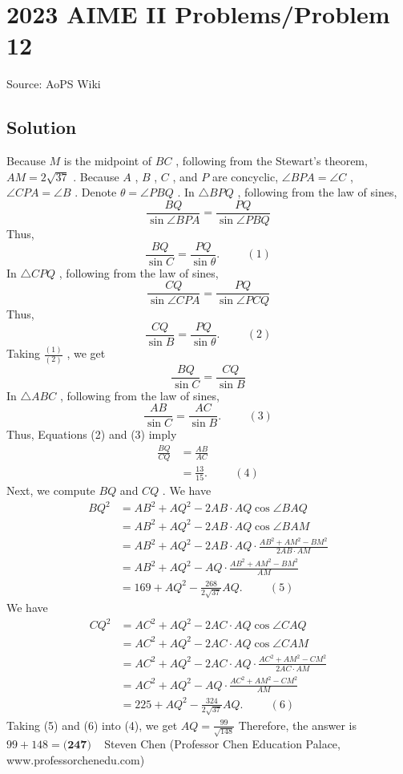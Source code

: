 \documentclass[12pt]{article}
\begin{document}
\section*{{2023 AIME II Problems/Problem 12}}
Source: AoPS Wiki

\subsection*{Solution}
Because $M$ is the midpoint of $BC$ , following from the Stewart's theorem, $AM = 2 \sqrt{37}$ . Because $A$ , $B$ , $C$ , and $P$ are concyclic, $\angle BPA = \angle C$ , $\angle CPA = \angle B$ . Denote $\theta = \angle PBQ$ . In $\triangle BPQ$ , following from the law of sines, \[ \frac{BQ}{\sin \angle BPA} = \frac{PQ}{\sin \angle PBQ} \] Thus, \[ \frac{BQ}{\sin C} = \frac{PQ}{\sin \theta} . \hspace{1cm} (1) \] In $\triangle CPQ$ , following from the law of sines, \[ \frac{CQ}{\sin \angle CPA} = \frac{PQ}{\sin \angle PCQ} \] Thus, \[ \frac{CQ}{\sin B} = \frac{PQ}{\sin \theta} . \hspace{1cm} (2) \] Taking $\frac{(1)}{(2)}$ , we get \[ \frac{BQ}{\sin C} = \frac{CQ}{\sin B} \] In $\triangle ABC$ , following from the law of sines, \[ \frac{AB}{\sin C} = \frac{AC}{\sin B} . \hspace{1cm} (3) \] Thus, Equations (2) and (3) imply \begin{align*} \frac{BQ}{CQ} & = \frac{AB}{AC} \\ & = \frac{13}{15} . \hspace{1cm} (4) \end{align*} Next, we compute $BQ$ and $CQ$ . We have \begin{align*} BQ^2 & = AB^2 + AQ^2 - 2 AB\cdot AQ \cos \angle BAQ \\ & = AB^2 + AQ^2 - 2 AB\cdot AQ \cos \angle BAM \\ & = AB^2 + AQ^2 - 2 AB\cdot AQ \cdot \frac{AB^2 + AM^2 - BM^2}{2 AB \cdot AM} \\ & = AB^2 + AQ^2 - AQ \cdot \frac{AB^2 + AM^2 - BM^2}{AM} \\ & = 169 + AQ^2 - \frac{268}{2 \sqrt{37}} AQ . \hspace{1cm} (5) \end{align*} We have \begin{align*} CQ^2 & = AC^2 + AQ^2 - 2 AC\cdot AQ \cos \angle CAQ \\ & = AC^2 + AQ^2 - 2 AC\cdot AQ \cos \angle CAM \\ & = AC^2 + AQ^2 - 2 AC\cdot AQ \cdot \frac{AC^2 + AM^2 - CM^2}{2 AC \cdot AM} \\ & = AC^2 + AQ^2 - AQ \cdot \frac{AC^2 + AM^2 - CM^2}{AM} \\ & = 225 + AQ^2 - \frac{324}{2 \sqrt{37}} AQ . \hspace{1cm} (6) \end{align*} Taking (5) and (6) into (4), we get $AQ = \frac{99}{\sqrt{148}}$ Therefore, the answer is $99 + 148 = \boxed{\textbf{(247) }}$ ~Steven Chen (Professor Chen Education Palace, www.professorchenedu.com)
\end{document}
